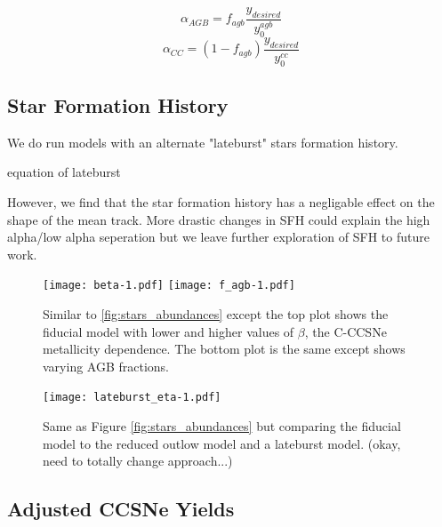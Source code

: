 \documentclass[fleqn,usenatbib]{mnras}
\begin{document}
\begin{equation}
    \alpha_{AGB} = f_{agb} \frac{y_{desired}}{y_0^{agb}}
\end{equation}
\begin{equation}
    \alpha_{CC} = (1 - f_{agb}) \frac{y_{desired}}{y_0^{cc}}
\end{equation}




\subsection{Star Formation History}

We do run models with an alternate "lateburst" stars formation history.

equation of lateburst

However, we find that the star formation history has a negligable effect on the shape of the mean track. More drastic changes in SFH could explain the high alpha/low alpha seperation but we leave further exploration of SFH to future work. 





\begin{figure}
\texttt{[image: beta-1.pdf]}
\texttt{[image: f\_agb-1.pdf]}

\caption{Similar to \ref{fig:stars_abundances} except the top plot shows the fiducial model with lower and higher values of $\beta$, the C-CCSNe metallicity dependence. The bottom plot is the same except shows varying AGB fractions.}
\end{figure}

\begin{figure}
\texttt{[image: lateburst\_eta-1.pdf]}

\caption{Same as Figure \ref{fig:stars_abundances} but comparing the fiducial model to the reduced outlow model and a lateburst model. (okay, need to totally change approach...)}
\end{figure}

\subsection{Adjusted CCSNe Yields}
\end{document}
